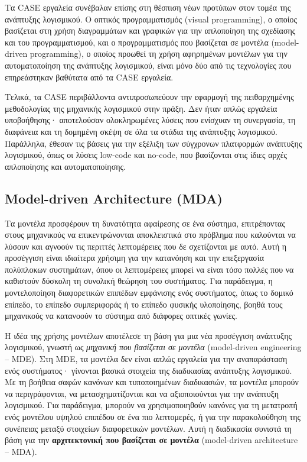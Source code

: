             Τα CASE εργαλεία συνέβαλαν επίσης στη θέσπιση νέων προτύπων στον τομέα της ανάπτυξης λογισμικού. Ο οπτικός προγραμματισμός (visual programming), ο οποίος βασίζεται στη χρήση διαγραμμάτων και γραφικών για την απλοποίηση της σχεδίασης και του προγραμματισμού, και ο προγραμματισμός που βασίζεται σε μοντέλα (model-driven programming), ο οποίος προωθεί τη χρήση αφηρημένων μοντέλων για την αυτοματοποίηση της ανάπτυξης λογισμικού, είναι μόνο δύο από τις τεχνολογίες που επηρεάστηκαν βαθύτατα από τα CASE εργαλεία.

            Τελικά, τα CASE περιβάλλοντα αντιπροσωπεύουν την εφαρμογή της πειθαρχημένης μεθοδολογίας της μηχανικής λογισμικού στην πράξη. Δεν ήταν απλώς εργαλεία υποβοήθησης· αποτελούσαν ολοκληρωμένες λύσεις που ενίσχυαν τη συνεργασία, τη διαφάνεια και τη δομημένη σκέψη σε όλα τα στάδια της ανάπτυξης λογισμικού. Παράλληλα, έθεσαν τις βάσεις για την εξέλιξη των σύγχρονων πλατφορμών ανάπτυξης λογισμικού, όπως οι λύσεις low-code και no-code, που βασίζονται στις ίδιες αρχές απλοποίησης και αυτοματοποίησης. \cite{CASEChikofsky, Case1985, CASEKuhn, AdoptionCASE}

        \subsection{Model-driven Architecture (MDA)}
            Τα μοντέλα προσφέρουν τη δυνατότητα αφαίρεσης σε ένα σύστημα, επιτρέποντας στους μηχανικούς να επικεντρώνονται αποκλειστικά στο πρόβλημα που καλούνται να λύσουν και αγνοούν τις περιττές λεπτομέρειες που δε σχετίζονται με αυτό. Αυτή η προσέγγιση είναι ιδιαίτερα χρήσιμη για την κατανόηση και την επεξεργασία πολύπλοκων συστημάτων, όπου οι λεπτομέρειες μπορεί να είναι τόσο πολλές που να καθιστούν δύσκολη τη συνολική θεώρηση του συστήματος. Για παράδειγμα, η μοντελοποίηση διαφορετικών επιπέδων εμφάνισης ενός συστήματος, όπως το δομικό επίπεδο, το επίπεδο συμπεριφοράς ή το επίπεδο φυσικής υλοποίησης, βοηθά τους μηχανικούς να κατανοούν το σύστημα από διάφορες οπτικές γωνίες.

            Η ιδέα της χρήσης μοντέλων αποτέλεσε τη βάση για μια νέα προσέγγιση ανάπτυξης λογισμικού, γνωστή ως \textit{μηχανική που βασίζεται σε μοντέλα} (model-driven engineering -- MDE). Στη MDE, τα μοντέλα δεν είναι απλώς εργαλεία για την αναπαράσταση ενός συστήματος· γίνονται βασικά στοιχεία της διαδικασίας ανάπτυξης λογισμικού. Με τη βοήθεια σαφών κανόνων και τυποποιημένων διαδικασιών, τα μοντέλα μπορούν να περιγράφονται, να μετασχηματίζονται και να αξιοποιούνται για την ανάπτυξη λογισμικού. Για παράδειγμα, μπορούν να χρησιμοποιηθούν κανόνες για τη μετατροπή ενός μοντέλου υψηλού επιπέδου σε ένα πιο λεπτομερές, ή για την παρακολούθηση της συνέπειας μεταξύ στοιχείων διαφορετικών μοντέλων. Αυτή η διαδικασία συνιστά τη βάση για την \textbf{αρχιτεκτονική που βασίζεται σε μοντέλα} (model-driven architecture -- MDA).

